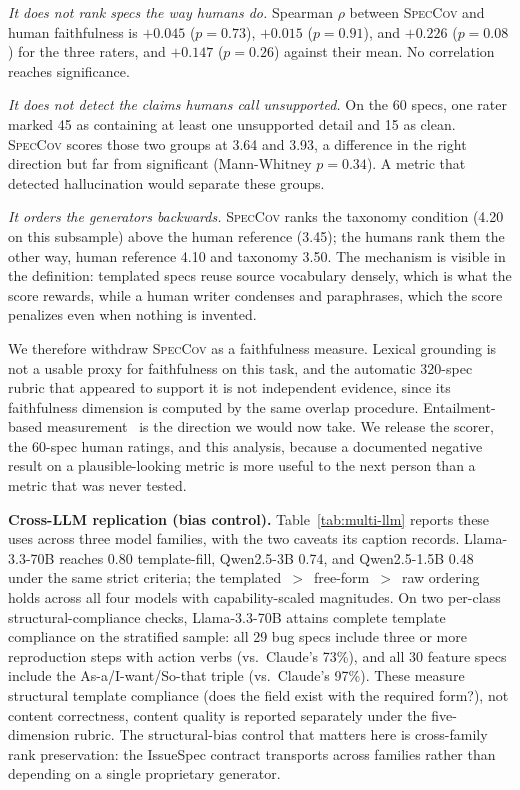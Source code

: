 \documentclass[sigconf, anonymous]{acmart}
\begin{document}
\emph{It does not rank specs the way humans do.} Spearman $\rho$ between \textsc{SpecCov} and
human faithfulness is $+0.045$ ($p = 0.73$), $+0.015$ ($p = 0.91$), and $+0.226$ ($p = 0.08$) for
the three raters, and $+0.147$ ($p = 0.26$) against their mean. No correlation reaches
significance.

\emph{It does not detect the claims humans call unsupported.} On the 60 specs, one rater marked
45 as containing at least one unsupported detail and 15 as clean. \textsc{SpecCov} scores those
two groups at 3.64 and 3.93, a difference in the right direction but far from significant
(Mann-Whitney $p = 0.34$). A metric that detected hallucination would separate these groups.

\emph{It orders the generators backwards.} \textsc{SpecCov} ranks the taxonomy condition (4.20 on this subsample) above the human
reference (3.45); the humans rank them the other way, human
reference 4.10 and taxonomy 3.50. The mechanism is visible in the definition: templated specs
reuse source vocabulary densely, which is what the score rewards, while a human writer condenses
and paraphrases, which the score penalizes even when nothing is invented.

We therefore withdraw \textsc{SpecCov} as a faithfulness measure. Lexical grounding is not a
usable proxy for faithfulness on this task, and the automatic 320-spec rubric that appeared to
support it is not independent evidence, since its faithfulness dimension is computed by the same
overlap procedure. Entailment-based measurement~\cite{laban2022summac, honovich2022true,
durmus2020feqa} is the direction we would now take. We release the scorer, the 60-spec human
ratings, and this analysis, because a documented negative result on a plausible-looking metric
is more useful to the next person than a metric that was never tested.

\textbf{Cross-LLM replication (bias control).} Table~\ref{tab:multi-llm} reports these uses across three model families, with the two caveats its caption records. Llama-3.3-70B reaches 0.80 template-fill, Qwen2.5-3B 0.74, and Qwen2.5-1.5B 0.48 under the same strict criteria; the templated~$>$~free-form~$>$~raw ordering holds across all four models with capability-scaled magnitudes. On two per-class structural-compliance checks, Llama-3.3-70B attains complete template compliance on the stratified sample: all 29 bug specs include three or more reproduction steps with action verbs (vs.\ Claude's 73\%), and all 30 feature specs include the As-a/I-want/So-that triple (vs.\ Claude's 97\%). These measure structural template compliance (does the field exist with the required form?), not content correctness, content quality is reported separately under the five-dimension rubric. The structural-bias control that matters here is cross-family rank preservation: the IssueSpec contract transports across families rather than depending on a single proprietary generator.
\end{document}
